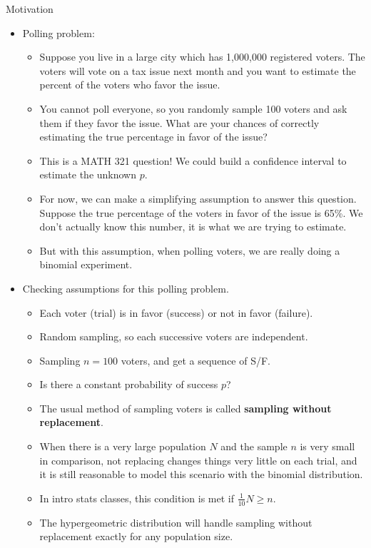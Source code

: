 \documentclass{article}
\begin{document}
Motivation\bigskip
\begin{itemize}
    \item Polling problem:
    \begin{itemize}
        \item Suppose you live in a large city which has 1,000,000 registered voters. The voters will vote on a tax issue next month and you want to estimate the percent of the voters who favor the issue.
        \item[] You cannot poll everyone, so you randomly sample 100 voters and ask them if they favor the issue. What are your chances of correctly estimating  the true percentage in favor of the issue?
        \item[] This is a MATH 321 question! We could build a confidence interval to estimate the unknown $p$.
        \item For now, we can make a simplifying assumption to answer this question. Suppose the true percentage of the voters in favor of the issue is 65\%. We don't actually know this number, it is what we are trying to estimate.
        \item But with this assumption, when polling voters, we are really doing a binomial experiment.
    \end{itemize}\vspace{40pt}
    \item Checking assumptions for this polling problem.
    \begin{itemize}
        \item Each voter (trial) is in favor (success) or not in favor (failure).
        \item[] Random sampling, so each successive voters are independent.
        \item[] Sampling $n = 100$ voters, and get a sequence of S/F.
        \item[] Is there a constant probability of success $p$?
        \item The usual method of sampling voters is called \textbf{sampling without replacement}.\vspace{60pt}
        \item When there is a very large population $N$ and the sample $n$ is very small in comparison, not replacing changes things very little on each trial, and it is still reasonable to model this scenario with the binomial distribution.
        \item[] In intro stats classes, this condition is met if $\frac{1}{10} N \ge n$.
        \item The hypergeometric distribution will handle sampling without replacement exactly for any population size.

\end{itemize}
\end{itemize}
\end{document}
